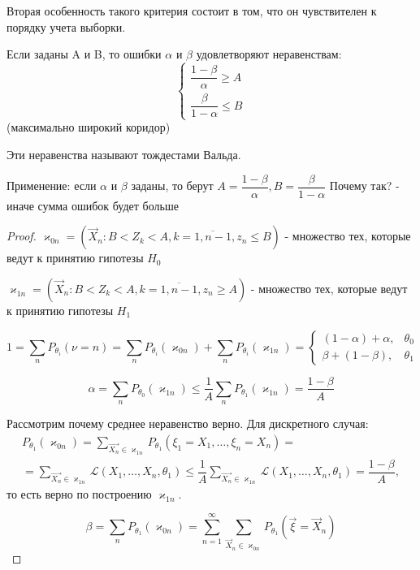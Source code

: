 Вторая особенность такого критерия состоит в том, что он чувствителен к порядку учета выборки.

\begin{theorem}[Вальда]
  Если заданы A и B, то ошибки $\alpha$ и $\beta$ удовлетворяют неравенствам:
  \begin{equation*}
    \begin{cases}
      \dfrac{1 - \beta}{\alpha} \geqslant A \\[1em]
      \dfrac{\beta}{1 - \alpha} \leqslant B
    \end{cases}
  \end{equation*}
  (максимально широкий коридор)

  Эти неравенства называют тождестами Вальда.

\end{theorem}

Применение: если $\alpha$ и $\beta$ заданы, то берут $A = \dfrac{1-\beta}{\alpha}, B = \dfrac{\beta}{1 - \alpha}$
Почему так? - иначе сумма ошибок будет больше

\begin{proof}
  $\varkappa_{0n} = \left( \vec{X}_n : B < Z_k < A, k = \overline{1, n-1}, z_n \leqslant B \right)$ - множество тех, которые ведут к принятию гипотезы $H_0$

  $\varkappa_{1n} = \left( \vec{X}_n : B < Z_k < A, k = \overline{1, n-1}, z_n \geqslant A \right)$ - множество тех, которые ведут к принятию гипотезы $H_1$

  \begin{equation*}
    1 = \sum_n P_{\theta_i} (\nu = n) = \sum_n P_{\theta_i} (\varkappa_{0n}) + \sum_n P_{\theta_i} (\varkappa_{1n}) =
    \begin{cases}
      (1 - \alpha) + \alpha, &\theta_0 \\
      \beta + (1 - \beta), &\theta_1
    \end{cases} 
  \end{equation*}

  \[
    \alpha
    = \sum_n P_{\theta_0} (\varkappa_{1n})
    \leqslant \dfrac{1}{A} \sum_n P_{\theta_1} (\varkappa_{1n})
    = \dfrac{1 - \beta}{A}
  \]
  
  Рассмотрим почему среднее неравенство верно. Для дискретного случая:
  \begin{multline*}
    P_{\theta_1} (\varkappa_{0n})
    = \sum_{\vec{X_n} \in \varkappa_{1n}} P_{\theta_1}(\xi_1 = X_1, \dots, \xi_n = X_n) = \\
    = \sum_{\vec{X_n} \in \varkappa_{1n}} \mathcal{L} (X_1, \dots, X_n, \theta_1)
    \leqslant \dfrac{1}{A} \sum_{\vec{X_n} \in \varkappa_{1n}} \mathcal{L} (X_1, \dots, X_n, \theta_1)
    = \dfrac{1 - \beta}{A},
  \end{multline*}
  то есть верно по построению $\varkappa_{1n}$.

  \[
    \beta = \sum_{n} P_{\theta_1} (\varkappa_{0n})
    = \sum_{n=1}^\infty \sum_{\vec{X}_n \in \varkappa_{0n}} P_{\theta_1} (\vec{\xi}
    = \vec{X}_n)
  \]
\end{proof}

